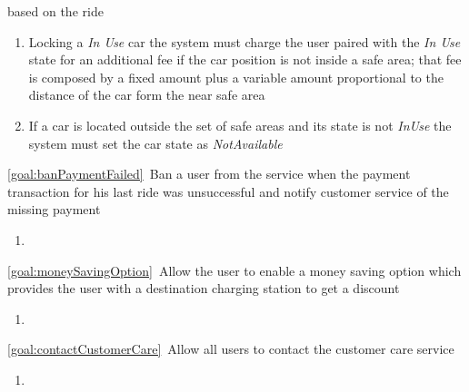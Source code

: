 \begin{description}
  		based on the ride
  			\begin{enumerate}[resume*]
  				\item Locking a \emph{In Use} car the system must charge the user paired with the
  				\emph{In Use} state for an additional fee if the car position is not inside a safe area;
  				that fee is composed by a fixed amount plus a variable amount proportional to the
  				distance of the car form the near safe area
  				\item If a car is located outside the set of safe areas and its state is not \emph{InUse}
  				the system must set the car state as \emph{NotAvailable}
   			\end{enumerate}
   		\item \ref{goal:banPaymentFailed}\ Ban a user from the service when the payment
   		transaction for his last ride was unsuccessful and notify customer service of the missing
  		payment
  			\begin{enumerate}[resume*]
  				\item
  			\end{enumerate}
  		\item \ref{goal:moneySavingOption}\ Allow the user to enable a money saving option which
  		provides the user with a destination charging station to get a discount
  			\begin{enumerate}[resume*]
  				\item
   			\end{enumerate}
  		\item \ref{goal:contactCustomerCare}\ Allow all users to contact the customer care service
  			\begin{enumerate}[resume*]
  				\item
   			\end{enumerate}
  	\end{description}

